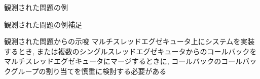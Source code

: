 \begin{frame}{観測された問題の例}
\end{frame}

\begin{frame}{観測された問題の例補足}
\end{frame}

\begin{frame}{観測された問題からの示唆}
    マルチスレッドエグゼキュータ上にシステムを実装するとき, または複数のシングルスレッドエグゼキュータからのコールバックをマルチスレッドエグゼキュータにマージするときに, コールバックのコールバックグループの割り当てを慎重に検討する必要がある
\end{frame}

